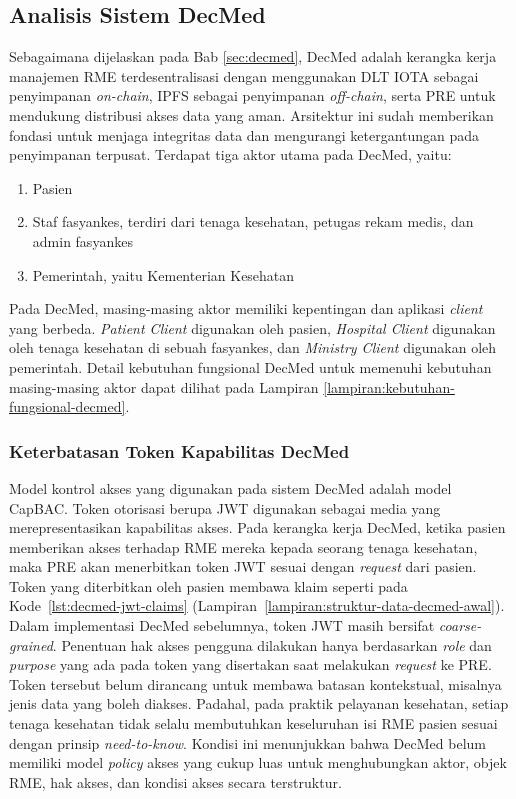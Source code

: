 \subsection{Analisis Sistem DecMed}
\label{subsec:analisis-sistem-decmed}

Sebagaimana dijelaskan pada Bab \ref{sec:decmed}, DecMed adalah kerangka kerja manajemen RME terdesentralisasi dengan menggunakan DLT IOTA sebagai penyimpanan \textit{on-chain}, IPFS sebagai penyimpanan \textit{off-chain}, serta PRE untuk mendukung distribusi akses data yang aman. Arsitektur ini sudah memberikan fondasi untuk menjaga integritas data dan mengurangi ketergantungan pada penyimpanan terpusat. Terdapat tiga aktor utama pada DecMed, yaitu:

\begin{enumerate}
	\item Pasien
	\item Staf fasyankes, terdiri dari tenaga kesehatan, petugas rekam medis, dan admin fasyankes
	\item Pemerintah, yaitu Kementerian Kesehatan
\end{enumerate}

Pada DecMed, masing-masing aktor memiliki kepentingan dan aplikasi \textit{client} yang berbeda. \textit{Patient Client} digunakan oleh pasien, \textit{Hospital Client} digunakan oleh tenaga kesehatan di sebuah fasyankes, dan \textit{Ministry Client} digunakan oleh pemerintah. Detail kebutuhan fungsional DecMed untuk memenuhi kebutuhan masing-masing aktor dapat dilihat pada Lampiran \ref{lampiran:kebutuhan-fungsional-decmed}.

\subsubsection{Keterbatasan Token Kapabilitas DecMed}
\label{subsubsec:keterbatasan-token-kapabilitas-decmed}

Model kontrol akses yang digunakan pada sistem DecMed adalah model CapBAC. Token otorisasi berupa JWT digunakan sebagai media yang merepresentasikan kapabilitas akses. Pada kerangka kerja DecMed, ketika pasien memberikan akses terhadap RME mereka kepada seorang tenaga kesehatan, maka PRE akan menerbitkan token JWT sesuai dengan \textit{request} dari pasien. Token yang diterbitkan oleh pasien membawa klaim seperti pada Kode~\ref{lst:decmed-jwt-claims} (Lampiran~\ref{lampiran:struktur-data-decmed-awal}). Dalam implementasi DecMed sebelumnya, token JWT masih bersifat \textit{coarse-grained}. Penentuan hak akses pengguna dilakukan hanya berdasarkan \textit{role} dan \textit{purpose} yang ada pada token yang disertakan saat melakukan \textit{request} ke PRE. Token tersebut belum dirancang untuk membawa batasan kontekstual, misalnya jenis data yang boleh diakses. Padahal, pada praktik pelayanan kesehatan, setiap tenaga kesehatan tidak selalu membutuhkan keseluruhan isi RME pasien sesuai dengan prinsip \textit{need-to-know}. Kondisi ini menunjukkan bahwa DecMed belum memiliki model \textit{policy} akses yang cukup luas untuk menghubungkan aktor, objek RME, hak akses, dan kondisi akses secara terstruktur.

